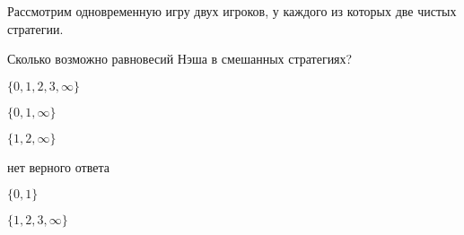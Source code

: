 
\begin{question}
Рассмотрим одновременную игру двух игроков, у каждого из которых две
чистых стратегии.

Сколько возможно равновесий Нэша в смешанных стратегиях?
\begin{answerlist}
  \item \(\{0, 1, 2, 3, \infty \}\)
  \item \(\{0, 1, \infty \}\)
  \item \(\{1, 2, \infty \}\)
  \item нет верного ответа
  \item \(\{0, 1\}\)
  \item \(\{1, 2, 3, \infty \}\)
\end{answerlist}
\end{question}


